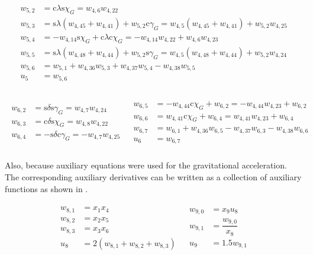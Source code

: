 \begin{align} \label{eq:u5AuxF}
\begin{split}
w_{5,2} &= \text{c}\lambda \text{s}\chi_{G} = w_{4,6}w_{4,22} \\
w_{5,3} &= \text{s}\lambda \left(w_{4,45}+w_{4,41}\right)+w_{5,2} \text{c}\gamma_{G} = w_{4,5} \left(w_{4,45}+w_{4,41}\right) +w_{5,2} w_{4,25} \\
w_{5,4} &= -w_{4,14} \text{s}\chi_{G}+\text{c}\lambda \text{c}\chi_{G} = -w_{4,14}w_{4,22}+w_{4,6}w_{4,23} \\
w_{5,5} &= \text{s}\lambda \left(w_{4,48}+w_{4,44}\right) + w_{5,2} \text{s}\gamma_{G} = w_{4,5} \left(w_{4,48}+w_{4,44}\right)+w_{5,2}w_{4,24} \\
w_{5,6} &= w_{5,1} + w_{4,36}w_{5,3}+w_{4,37}w_{5,4}-w_{4,38}w_{5,5} \\
u_{5} &= w_{5,6} \\
\end{split}
\end{align}

\begin{align} \label{eq:u6AuxF}
\begin{split}
w_{6,2} &= \text{s}\delta \text{s}\gamma_{G} = w_{4,7}w_{4,24} \\
w_{6,3} &= \text{c}\delta \text{s}\chi_{G} = w_{4,8}w_{4,22} \\
w_{6,4} &= -\text{s}\delta \text{c}\gamma_{G} = -w_{4,7}w_{4,25} \\
\end{split}
&
\begin{split}
w_{6,5} &= -w_{4,44} \text{c}\chi_{G} +w_{6,2} = -w_{4,44}w_{4,23}+w_{6,2} \\
w_{6,6} &= w_{4,41} \text{c}\chi_{G} + w_{6,4} = w_{4,41}w_{4,23}+w_{6,4} \\
w_{6,7} &= w_{6,1} + w_{4,36}w_{6,5}-w_{4,37}w_{6,3}-w_{4,38}w_{6,6} \\
u_{6} &= w_{6,7} \\
\end{split}
\end{align}

\noindent
Also, because auxiliary equations were used for the gravitational acceleration. The corresponding auxiliary derivatives can be written as a collection of auxiliary functions as shown in .

\begin{align} \label{eq:u8u9AuxF}
\begin{split}
w_{8,1} &= x_{1}x_{4} \\
w_{8,2} &= x_{2}x_{5} \\
w_{8,3} &= x_{3}x_{6} \\
u_{8} &= 2\left(w_{8,1}+w_{8,2}+w_{8,3}\right) \\ 
\end{split}
&
\begin{split}
w_{9,0} &= x_{9}u_{8} \\
w_{9,1} &= \dfrac{w_{9,0}}{x_{8}} \\
u_{9} &= 1.5 w_{9,1} \\
\end{split}
\end{align}


